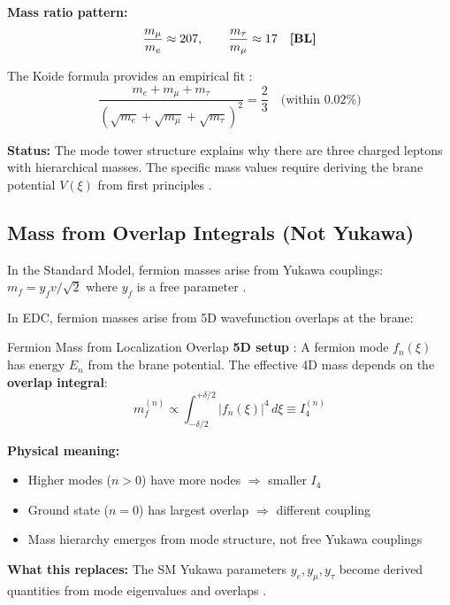\textbf{Mass ratio pattern:}
\begin{equation}
    \frac{m_\mu}{m_e} \approx 207, \qquad \frac{m_\tau}{m_\mu} \approx 17
    \quad \textbf{[BL]}{}
\end{equation}

The Koide formula provides an empirical fit \tagBL{}:
\begin{equation}
    \frac{m_e + m_\mu + m_\tau}{(\sqrt{m_e} + \sqrt{m_\mu} + \sqrt{m_\tau})^2} = \frac{2}{3}
    \quad \text{(within } 0.02\%\text{)}
\end{equation}

\textbf{Status:} The mode tower structure \tagI{} explains why there are three
charged leptons with hierarchical masses. The specific mass values require
deriving the brane potential $V(\xi)$ from first principles \tagOpen{}.

\subsection{Mass from Overlap Integrals (Not Yukawa)}

In the Standard Model, fermion masses arise from Yukawa couplings:
$m_f = y_f v / \sqrt{2}$ where $y_f$ is a free parameter \tagBL{}.

In EDC, fermion masses arise from 5D wavefunction overlaps at the brane:

\begin{mechanism}{Fermion Mass from Localization Overlap}
\textbf{5D setup} \tagDc{}:
A fermion mode $f_n(\xi)$ has energy $E_n$ from the brane potential.
The effective 4D mass depends on the \textbf{overlap integral}:
\begin{equation}
m_f^{(n)} \propto \int_{-\delta/2}^{+\delta/2} |f_n(\xi)|^4 \, d\xi \equiv I_4^{(n)}
\label{eq:overlap_mass}
\end{equation}

\textbf{Physical meaning:}
\begin{itemize}[nosep]
\item Higher modes ($n > 0$) have more nodes $\Rightarrow$ smaller $I_4$
\item Ground state ($n = 0$) has largest overlap $\Rightarrow$ different coupling
\item Mass hierarchy emerges from mode structure, not free Yukawa couplings
\end{itemize}

\textbf{What this replaces:} The SM Yukawa parameters $y_e, y_\mu, y_\tau$
become derived quantities from mode eigenvalues and overlaps \tagDc{}.
\end{mechanism}

